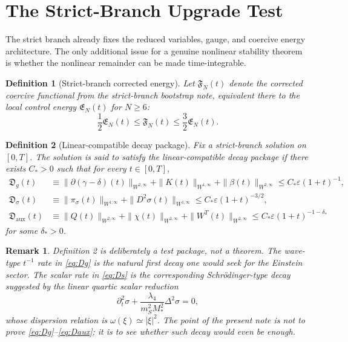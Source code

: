 \documentclass[11pt]{article}
\newtheorem{definition}{Definition}
\newtheorem{remark}{Remark}
\begin{document}
\section{The Strict-Branch Upgrade Test}

The strict branch already fixes the reduced variables, gauge, and coercive energy architecture. The only additional issue for a genuine nonlinear stability theorem is whether the nonlinear remainder can be made time-integrable.

\begin{definition}[Strict-branch corrected energy]
Let \(\mathfrak F_N(t)\) denote the corrected coercive functional from the strict-branch bootstrap note, equivalent there to the local control energy \(\mathfrak E_N(t)\) for \(N\ge 6\):
\begin{equation}
\frac{1}{2}\mathfrak E_N(t)
\le
\mathfrak F_N(t)
\le
\frac{3}{2}\mathfrak E_N(t).
\label{eq:Fequiv}
\end{equation}
\end{definition}

\begin{definition}[Linear-compatible decay package]
Fix a strict-branch solution on \([0,T]\). The solution is said to satisfy the \emph{linear-compatible decay package} if there exists \(C_\ast>0\) such that for every \(t\in[0,T]\),
\begin{align}
\mathfrak D_g(t)
&\equiv
\|\partial(\gamma-\delta)(t)\|_{W^{2,\infty}}
+ \|K(t)\|_{W^{1,\infty}}
+ \|\beta(t)\|_{W^{2,\infty}}
\le
C_\ast \varepsilon (1+t)^{-1},
\label{eq:Dg}
\\
\mathfrak D_\sigma(t)
&\equiv
\|\pi_\sigma(t)\|_{W^{1,\infty}}
+ \|D^2\sigma(t)\|_{W^{1,\infty}}
\le
C_\ast \varepsilon (1+t)^{-3/2},
\label{eq:Ds}
\\
\mathfrak D_{\mathrm{aux}}(t)
&\equiv
\|Q(t)\|_{W^{2,\infty}}
+ \|\chi(t)\|_{W^{2,\infty}}
+ \|W^T(t)\|_{W^{2,\infty}}
\le
C_\ast \varepsilon (1+t)^{-1-\delta_\ast}
\label{eq:Daux}
\end{align}
for some \(\delta_\ast>0\).
\end{definition}

\begin{remark}
Definition 2 is deliberately a \emph{test} package, not a theorem. The wave-type \(t^{-1}\) rate in \eqref{eq:Dg} is the natural first decay one would seek for the Einstein sector. The scalar rate in \eqref{eq:Ds} is the corresponding Schr\"odinger-type decay suggested by the linear quartic scalar reduction
\[
\partial_t^2 \sigma
+ \frac{\lambda_4}{m_S^2M_\ast^2}\Delta^2\sigma
=0,
\]
whose dispersion relation is \(\omega(\xi)\simeq |\xi|^2\). The point of the present note is not to prove \eqref{eq:Dg}--\eqref{eq:Daux}; it is to see whether such decay would even be enough.
\end{remark}
\end{document}
